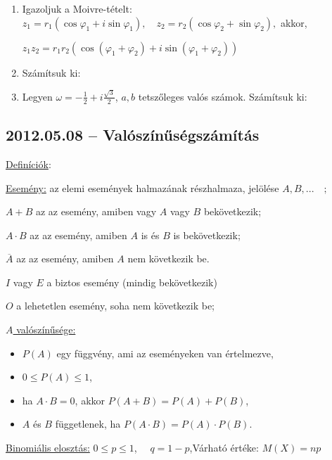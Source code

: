 \begin{enumerate}
\item Igazoljuk a Moivre-tételt: $z_1=r_1(\cos\varphi_1+ i \sin\varphi_1),\quad z_2=r_2(\cos\varphi_2+\sin\varphi_2),$ akkor,

$z_1z_2=r_1r_2(\cos(\varphi_1+\varphi_2)+i \sin (\varphi_1+\varphi_2))$
\item Számítsuk ki:
\item Legyen $\omega=-\frac{1}{2}+i\frac{\sqrt{3}}{2}$, $a,b$ tetszőleges valós számok. Számítsuk ki:
\end{enumerate}

\subsection*{2012.05.08 -- Valószínűségszámítás}
\underline{Definíciók}:

\underline{Esemény:} az elemi események halmazának részhalmaza, jelölése $A,B, ...\quad;$

$A+B$ az az esemény, amiben vagy $A$ vagy $B$ bekövetkezik;

$A\cdot B$ az az esemény, amiben $A$ is és $B$ is bekövetkezik;

$\overline{A}$ az az esemény, amiben $A$ nem következik be.

$I$ vagy $E$ a biztos esemény (mindig bekövetkezik)

$O$ a lehetetlen esemény, soha nem következik be;

\underline{$A$ valószínűsége:}
\begin{itemize}
\item $P(A)$ egy függvény, ami az eseményeken van értelmezve, 
\item $0\leq P(A) \leq 1$, 
\item ha $A\cdot B=0$, akkor $P(A+B)=P(A)+P(B)$, 
\item $A$ és $B$ függetlenek, ha $P(A\cdot B)=P(A)\cdot P(B)$. 
\end{itemize}
\underline{Binomiális elosztás:} $0\leq p \leq 1$,$\quad$ $q=1-p$,\qquad Várható értéke: $M(X)=np$

